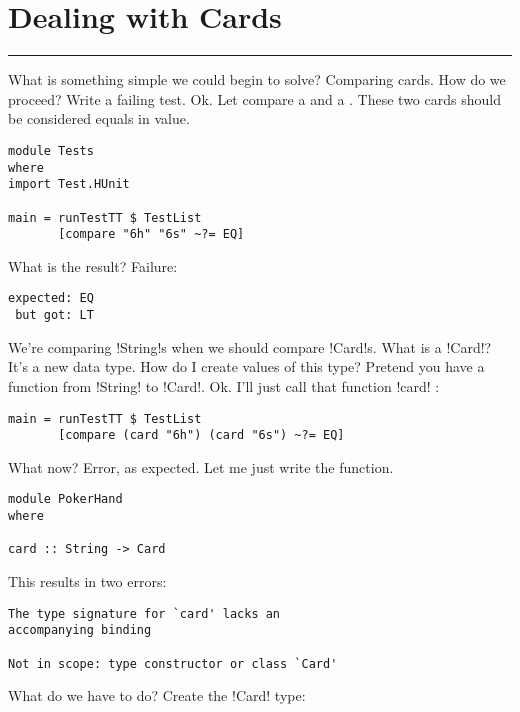 \newpage
\section{Dealing with Cards} %
\vspace{10cm}
\hrule

\lhQ What is something simple we could begin to solve?
\lhA Comparing cards.
\lhN How do we proceed?
\lhA Write a failing test.
\lhN Ok. Let compare a  and a . These two cards should be considered equals in value.
\begin{lstlisting}[frame=single]
module Tests
where 
import Test.HUnit

main = runTestTT $ TestList 
       [compare "6h" "6s" ~?= EQ]
\end{lstlisting} %
What is the result?
\lhA \failure Failure: 
\begin{small} 
\begin{verbatim}
expected: EQ
 but got: LT
\end{verbatim}
\end{small}
We're comparing \il!String!s when we should compare \il!Card!s.
\lhN What is a \il!Card!?
\lhA It's a new data type.
\lhN How do I create values of this type?
\lhA Pretend you have a function from \il!String! to \il!Card!.
\lhN Ok. I'll just call that function \il!card! :
\begin{lstlisting}[frame=single]
main = runTestTT $ TestList 
       [compare (card "6h") (card "6s") ~?= EQ] 
\end{lstlisting} %
What now?
\lhA \error Error, as expected. Let me just write the function.
\begin{lstlisting}[frame=single]
module PokerHand
where

card :: String -> Card
\end{lstlisting}
\lhN \error This results in two errors: 
\begin{small}
\begin{verbatim}
The type signature for `card' lacks an 
accompanying binding

Not in scope: type constructor or class `Card'
\end{verbatim}
\end{small}
What do we have to do?
\lhA \error Create the \il!Card! type:
